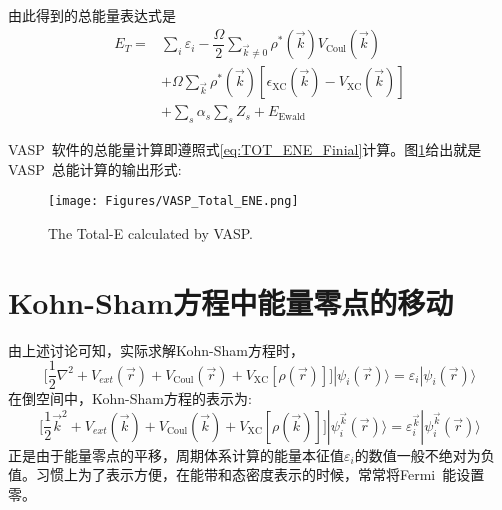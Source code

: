 \documentclass{article}      %
\begin{document}
由此得到的总能量表达式是
\begin{equation}
	\begin{aligned}
		E_T=&\sum_i\varepsilon_i-\dfrac{\Omega}2\sum_{\vec k\neq0}\rho^{\ast}(\vec k)V_{\mathrm{Coul}}(\vec k)\\
		&+\Omega\sum_{\vec k}\rho^{\ast}(\vec k)[\epsilon_{\mathrm{XC}}(\vec k)-V_{\mathrm{XC}}(\vec k)]\\
		&+\sum_s\alpha_s\sum_sZ_s+E_{\mathrm{Ewald}}
	\end{aligned}
	\label{eq:TOT_ENE_Finial}
\end{equation}

\textrm{VASP~}软件的总能量计算即遵照式\eqref{eq:TOT_ENE_Finial}计算。图\ref{TOTEN_VASP}给出就是\textrm{VASP~}总能计算的输出形式:~
\begin{figure}[h!]
\centering
\vspace*{-0.18in}
\texttt{[image: Figures/VASP\_Total\_ENE.png]}
\caption{\small \textrm{The Total-E calculated by VASP.}}%
\label{TOTEN_VASP}
\end{figure}

\section{\rm{Kohn-Sham}方程中能量零点的移动}
由上述讨论可知，实际求解\textrm{Kohn-Sham}方程时，
\begin{equation}
	\bigg[\dfrac12\nabla^2+V_{ext}(\vec r)+V_{\mathrm{Coul}}(\vec r)+V_{\mathrm{XC}}[\rho(\vec r)]\bigg]|\psi_i(\vec r)\rangle=\varepsilon_i|\psi_i(\vec r)\rangle
	\label{eq:DFT}
\end{equation}
在倒空间中，\textrm{Kohn-Sham}方程的表示为:
\begin{equation}
	\bigg[\dfrac12\vec k^2+V_{ext}(\vec k)+V_{\mathrm{Coul}}(\vec k)+V_{\mathrm{XC}}[\rho(\vec k)]\bigg]|\psi_i^{\vec k}(\vec r)\rangle=\varepsilon_i^{\vec k}|\psi_i^{\vec k}(\vec r)\rangle
	\label{eq:DFT-k}
\end{equation}
正是由于能量零点的平移，周期体系计算的能量本征值$\varepsilon_i$的数值一般不绝对为负值。习惯上为了表示方便，在能带和态密度表示的时候，常常将\textrm{Fermi~}能设置零。
\end{document}
